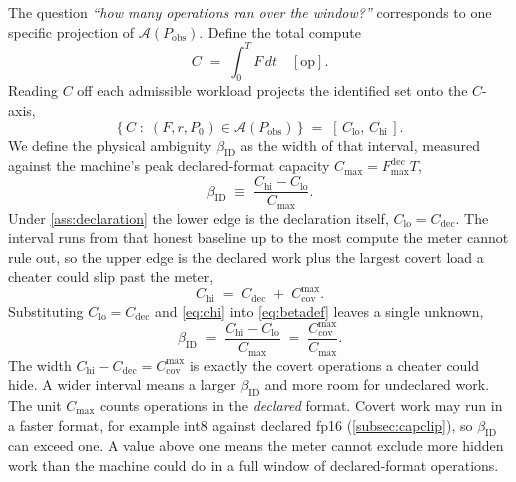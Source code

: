 \documentclass{article}
\theoremstyle{plain}
\theoremstyle{definition}
\theoremstyle{remark}
\begin{document}
The question \emph{``how many operations ran over the window?''} corresponds to one
specific projection of $\mathcal{A}(P_{\mathrm{obs}})$. Define the total
compute
\begin{equation}
	C \;=\; \int_0^T F\,dt \quad [\text{op}].
	\label{eq:totalcompute}
\end{equation}
Reading $C$ off each admissible workload projects the identified set onto the
$C$-axis,
\begin{equation}
	\bigl\{\, C \;:\; (F,r,P_0) \in \mathcal{A}(P_{\mathrm{obs}}) \,\bigr\} \;=\;
	[\,C_{\mathrm{lo}},\, C_{\mathrm{hi}}\,].
	\label{eq:projection}
\end{equation}
We define the physical ambiguity $\beta_{\mathrm{ID}}$ as the width of
that interval, measured against the
machine's peak declared-format capacity $C_{\max} = F_{\max}^{\mathrm{dec}}T$,
\begin{equation}
	\beta_{\mathrm{ID}} \;\equiv\; \frac{C_{\mathrm{hi}} - C_{\mathrm{lo}}}{C_{\max}}.
	\label{eq:betadef}
\end{equation}
Under \cref{ass:declaration} the lower edge is the declaration itself,
$C_{\mathrm{lo}} = C_{\mathrm{dec}}$.
The interval runs from that honest baseline up to
the most compute the meter cannot rule out, so the upper edge is the declared
work plus the largest covert load a cheater could slip past the meter,
\begin{equation}
	C_{\mathrm{hi}} \;=\; C_{\mathrm{dec}} \;+\; C_{\mathrm{cov}}^{\max}.
	\label{eq:chi}
\end{equation}
Substituting $C_{\mathrm{lo}} = C_{\mathrm{dec}}$ and \cref{eq:chi} into
\cref{eq:betadef} leaves a single unknown,
\begin{equation}
	\beta_{\mathrm{ID}} \;=\; \frac{C_{\mathrm{hi}} - C_{\mathrm{lo}}}{C_{\max}}
	\;=\; \frac{C_{\mathrm{cov}}^{\max}}{C_{\max}}.
	\label{eq:beta-reduced}
\end{equation}
The width $C_{\mathrm{hi}} - C_{\mathrm{dec}} = C_{\mathrm{cov}}^{\max}$ is
exactly the covert operations a cheater could hide. A wider interval means a larger
$\beta_{\mathrm{ID}}$ and more room for undeclared work.
The unit $C_{\max}$ counts operations in the \emph{declared} format. Covert
work may run in a faster format, for example int8 against declared fp16
(\cref{subsec:capclip}), so $\beta_{\mathrm{ID}}$ can exceed one. A value
above one means the meter cannot exclude more hidden work than the machine
could do in a full window of declared-format operations.
\end{document}
